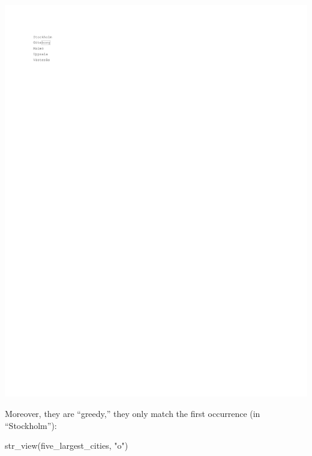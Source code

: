 \documentclass[
]{book}
\newenvironment{Shaded}{\begin{snugshade}}{\end{snugshade}}
\newcommand{\FunctionTok}[1]{\textcolor[rgb]{0.00,0.00,0.00}{#1}}
\newcommand{\NormalTok}[1]{#1}
\newcommand{\StringTok}[1]{\textcolor[rgb]{0.31,0.60,0.02}{#1}}
\begin{document}
\includegraphics{_main_files/figure-latex/unnamed-chunk-19-1.pdf}

Moreover, they are ``greedy,'' they only match the first occurrence (in ``Stockholm''):

\begin{Shaded}
\begin{Highlighting}[]
\FunctionTok{str\_view}\NormalTok{(five\_largest\_cities, }\StringTok{"o"}\NormalTok{)}
\end{Highlighting}
\end{Shaded}
\end{document}
